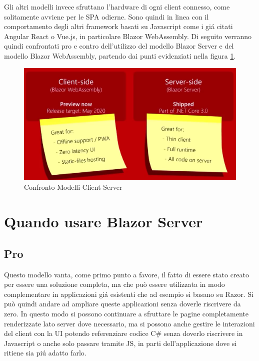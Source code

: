 Gli altri modelli invece sfruttano l'hardware di ogni client connesso, come solitamente avviene per le SPA odierne.
Sono quindi in linea con il comportamento degli altri framework basati su Javascript come i gi\'a citati Angular React o Vue.js, in particolare Blazor WebAssembly. 
Di seguito verranno quindi confrontati pro e contro dell'utilizzo del modello Blazor Server e del modello Blazor WebAssembly, partendo dai punti evidenziati nella figura \ref{fig:blazorModelsProCons}.
\begin{figure}[H]
	\centerline{\includegraphics[scale=0.8]{figure/ClientServerProCons.png}}
	\caption{Confronto Modelli Client-Server}
	\label{fig:blazorModelsProCons}
\end{figure}

\section{Quando usare Blazor Server}\label{sez:scalabilitaBServer}
\subsection{Pro}\label{sez:proBServer}
Questo modello vanta, come primo punto a favore, il fatto di essere stato creato per essere una soluzione completa, ma che pu\`o essere utilizzata in modo complementare in applicazioni gi\'a esistenti che ad esempio si basano su Razor.
Si pu\`o quindi andare ad ampliare queste applicazioni senza doverle riscrivere da zero.
In questo modo si possono continuare a sfruttare le pagine completamente renderizzate lato server dove necessario, ma si possono anche gestire le interazioni del client con la UI potendo referenziare codice C\# senza doverlo riscrivere in Javascript o anche solo passare tramite JS, in parti dell'applicazione dove si ritiene sia pi\'u adatto farlo.

